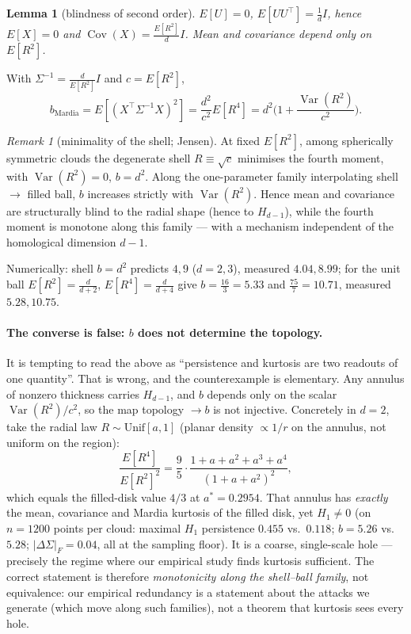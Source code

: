 \documentclass[11pt]{article}
\newtheorem{lemma}{Lemma}
\theoremstyle{remark}
\newtheorem{remark}{Remark}
\begin{document}
\begin{lemma}[blindness of second order]
$E[U]=0$, $E[UU^\top]=\tfrac1d I$, hence $E[X]=0$ and $\operatorname{Cov}(X)=\tfrac{E[R^2]}{d}I$.
Mean and covariance depend only on $E[R^2]$.
\end{lemma}

With $\Sigma^{-1}=\tfrac{d}{E[R^2]}I$ and $c=E[R^2]$,
\[
b_{\mathrm{Mardia}}=E[(X^\top\Sigma^{-1}X)^2]=\frac{d^2}{c^2}E[R^4]
=d^2\Big(1+\frac{\operatorname{Var}(R^2)}{c^2}\Big).
\]

\begin{remark}[minimality of the shell; Jensen]
At fixed $E[R^2]$, among spherically symmetric clouds the degenerate shell $R\equiv\sqrt c$
minimises the fourth moment, with $\operatorname{Var}(R^2)=0$, $b=d^2$. Along the one-parameter
family interpolating shell $\to$ filled ball, $b$ increases strictly with
$\operatorname{Var}(R^2)$. Hence mean and covariance are structurally blind to the radial shape
(hence to $H_{d-1}$), while the fourth moment is monotone along this family --- with a mechanism
independent of the homological dimension $d-1$.
\end{remark}

Numerically: shell $b=d^2$ predicts $4,9$ ($d=2,3$), measured $4.04,8.99$; for the unit ball
$E[R^2]=\tfrac{d}{d+2}$, $E[R^4]=\tfrac{d}{d+4}$ give $b=\tfrac{16}{3}=5.33$ and
$\tfrac{75}{7}=10.71$, measured $5.28,10.75$.

\paragraph{The converse is false: $b$ does not determine the topology.}
It is tempting to read the above as ``persistence and kurtosis are two readouts of one
quantity''. That is wrong, and the counterexample is elementary. Any annulus of nonzero thickness
carries $H_{d-1}$, and $b$ depends only on the scalar
$\operatorname{Var}(R^2)/c^2$, so the map topology $\to b$ is not injective. Concretely in $d=2$, take the radial law $R\sim\mathrm{Unif}[a,1]$ (planar density
$\propto1/r$ on the annulus, not uniform on the region):
\[
\frac{E[R^4]}{E[R^2]^2}=\frac95\cdot\frac{1+a+a^2+a^3+a^4}{(1+a+a^2)^2},
\]
which equals the filled-disk value $4/3$ at $a^\ast=0.2954$. That annulus has \emph{exactly} the
mean, covariance and Mardia kurtosis of the filled disk, yet $H_1\neq0$ (on $n=1200$ points per cloud: maximal
$H_1$ persistence $0.455$ vs.\ $0.118$; $b=5.26$ vs.\ $5.28$; $\lvert\Delta\Sigma\rvert_F=0.04$,
all at the sampling floor). It is a coarse, single-scale hole --- precisely the regime where our
empirical study finds kurtosis sufficient. The correct statement is therefore \emph{monotonicity
along the shell--ball family}, not equivalence: our empirical redundancy is a statement about the
attacks we generate (which move along such families), not a theorem that kurtosis sees every hole.
\end{document}

